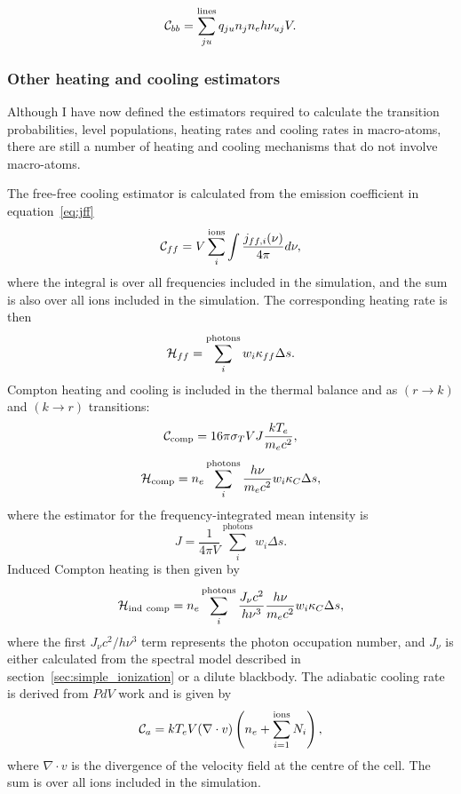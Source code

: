 \begin{equation}
{\cal C}_{bb} = \sum_{ju}^{\mathrm{lines}} q_{ju} n_j n_e h \nu_{uj} V.
\end{equation}

\subsubsection{Other heating and cooling estimators}
Although I have now defined the estimators required to calculate the 
transition probabilities, level populations, heating rates and cooling rates in macro-atoms, 
there are still a number of heating and cooling mechanisms that do not involve macro-atoms. 

The free-free cooling estimator is calculated from the emission coefficient
in equation~\ref{eq:jff} 
\begin{equation}
{\cal C}_{ff} = V \sum_i^{\mathrm{ions}} \int \frac{j_{ff,i}(\nu)}{4\pi} d\nu,
\end{equation}
where the integral is over all frequencies included in the simulation,
and the sum is also over all ions included in the simulation.
The corresponding heating rate is then
\begin{equation}
{\cal H}_{ff} = \sum_i^{\mathrm{photons}} w_i \kappa_{ff} \Delta s.
\end{equation}
Compton heating and cooling is included in the thermal balance and as
$(r\rightarrow k)$ and $(k\rightarrow r)$ transitions:
\begin{equation}
{\cal C}_{\mathrm{comp}} = 16 \pi \sigma_T V J \frac{k T_e}{m_e c^2},
\end{equation}
\begin{equation}
{\cal H}_{\mathrm{comp}} = n_e \sum_i^{\mathrm{photons}} \frac{h\nu}{m_e c^2} w_i \kappa_{C}\Delta s,
\end{equation}
where the estimator for the frequency-integrated mean intensity is
\begin{equation}
J = \frac{1}{4\pi V} \sum_i^{\mathrm{photons}} w_i \Delta s.
\label{eq:j}
\end{equation}
Induced Compton heating is then given by \citep{cloudy2013}
\begin{equation}
{\cal H}_{\mathrm{ind~comp}} = n_e \sum_i^{\mathrm{photons}} \frac{J_\nu c^2}{h \nu^3} \frac{h\nu}{m_e c^2} 
w_i \kappa_{C} \Delta s,
\end{equation}
where the first $J_\nu c^2/h \nu^3$ term represents the
photon occupation number, and $J_\nu$ is either 
calculated from the spectral model
described in section~\ref{sec:simple_ionization} or a dilute blackbody.
The adiabatic cooling rate is derived from $PdV$ work and is given by
\begin{equation}
{\cal C}_{a} = k T_e V (\nabla \cdot v) \left(n_e + \sum\limits_{i=1}^{\mathrm{ions}} N_i\right),
\end{equation}
where $\nabla \cdot v$ is the divergence of the 
velocity field at the centre of the cell. The sum is over all ions 
included in the simulation.

